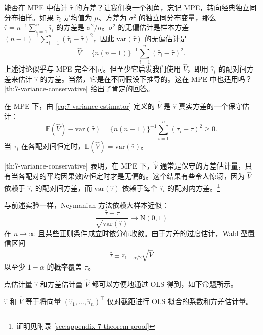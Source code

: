 能否在 MPE 中估计 $\hat\tau$ 的方差？让我们换一个视角，忘记 MPE，转向经典独立同分布抽样。如果 $\hat\tau_i$ 是均值为 $\mu$、方差为 $\sigma^2$ 的独立同分布变量，那么 $\hat\tau = n^{-1}\sum_{i=1}^n \hat\tau_i$ 的方差是 $\sigma^2/n$。$\sigma^2$ 的无偏估计是样本方差 $(n-1)^{-1}\sum_{i=1}^n (\hat\tau_i - \hat\tau)^2$，因此 $\text{var}(\hat\tau)$ 的无偏估计是
\begin{equation}
\hat V = \{n(n-1)\}^{-1} \sum_{i=1}^n (\hat\tau_i - \hat\tau)^2.
\label{eq:7-variance-estimator}
\end{equation}
上述讨论似乎与 MPE 完全不同。但至少它启发我们使用 $\hat V$，即用 $\hat\tau_i$ 的配对间方差来估计 $\hat\tau$ 的方差。当然，它是在不同假设下推导的。这在 MPE 中也适用吗？\cref{th:7-variance-conservative} 给出了肯定的回答。

\begin{Theorem}[方差估计的保守性]\label{th:7-variance-conservative}
在 MPE 下，由 \cref{eq:7-variance-estimator} 定义的 $\hat V$ 是 $\hat\tau$ 真实方差的一个保守估计：
\begin{equation}
\mathbb{E}(\hat V) - \text{var}(\hat\tau) = \{n(n-1)\}^{-1} \sum_{i=1}^n (\tau_i - \tau)^2 \geq 0.
\label{eq:7-variance-bias}
\end{equation}
当 $\tau_i$ 在各配对间恒定时，$\mathbb{E}(\hat V) = \text{var}(\hat\tau)$。
\end{Theorem}

\cref{th:7-variance-conservative} 表明，在 MPE 下，$\hat V$ 通常是保守的方差估计量，只有当各配对的平均因果效应恒定时才是无偏的。这个结果有些令人惊讶，因为 $\hat V$ 依赖于 $\hat\tau_i$ 的配对间方差，而 $\text{var}(\hat\tau)$ 依赖于每个 $\hat\tau_i$ 的配对内方差。\footnote{证明见附录 \cref{sec:appendix-7-theorem-proof}}

与前述实验一样，Neymanian 方法依赖大样本近似：
\begin{equation}
\frac{\hat\tau - \tau}{\sqrt{\text{var}(\hat\tau)}} \to \mathrm{N}(0, 1)
\label{eq:7-clt}
\end{equation}
在 $n \to \infty$ 且某些正则条件成立时依分布收敛。由于方差的过度估计，Wald 型置信区间
\begin{equation}
\hat\tau \pm z_{1-\alpha/2} \sqrt{\hat V}
\label{eq:7-wald-ci}
\end{equation}
以至少 $1 - \alpha$ 的概率覆盖 $\tau$。

点估计量 $\hat\tau$ 和方差估计量 $\hat V$ 都可以方便地通过 OLS 得到，如下命题所示。

\begin{Proposition}[OLS 解释]\label{prop:7-ols}
$\hat\tau$ 和 $\hat V$ 等于将向量 $(\hat\tau_1, \dots, \hat\tau_n)^\top$ 仅对截距进行 OLS 拟合的系数和方差估计量。
\end{Proposition}

